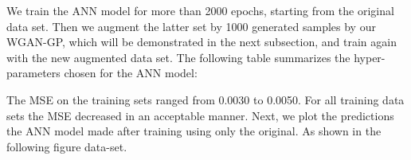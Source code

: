 \documentclass[draft, a4, 10pt, onecolumn]{IEEEtran}
\begin{document}
We train the ANN model for more than 2000 epochs, starting from the original data set. Then we augment the latter set by 1000 generated samples by our WGAN-GP, which will be demonstrated in the next subsection, and train again with the new augmented data set. The following table summarizes the hyper-parameters chosen for the ANN model:
\begin{table}[h]
\centering
{}
\caption{Hyper-parameters chosen for the ANN model}
\end{table}

\newpage
The MSE on the training sets ranged from 0.0030 to 0.0050. For all training data sets the MSE decreased in an acceptable manner. Next, we plot the predictions the ANN model made after training using only the original. As shown in the following figure data-set.
\end{document}
